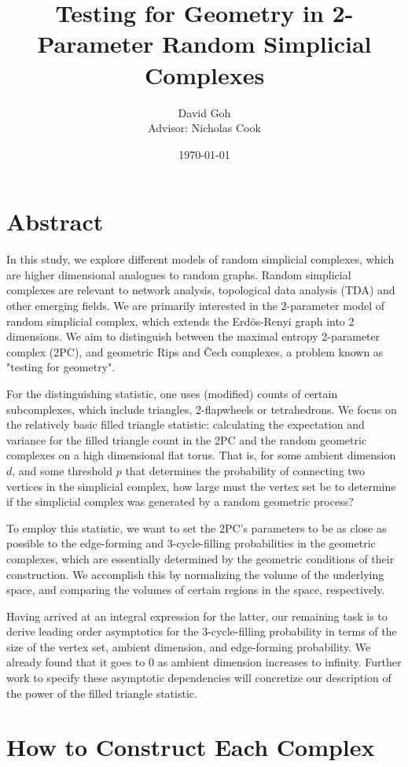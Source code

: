 \documentclass[11pt]{article}
\title{Testing for Geometry in 2-Parameter Random Simplicial Complexes}
\author{David Goh \\ Advisor: Nicholas Cook}
\date{\today}
\theoremstyle{definition}
\begin{document}
\maketitle

\section{Abstract}

In this study, we explore different models of random simplicial complexes, which are higher dimensional analogues to random graphs. Random simplicial complexes are relevant to network analysis, topological data analysis (TDA) and other emerging fields. We are primarily interested in the 2-parameter model of random simplicial complex, which extends the Erd\"{o}s-Renyi graph into 2 dimensions. We aim to distinguish between the maximal entropy 2-parameter complex (2PC), and geometric Rips and Čech complexes, a problem known as "testing for geometry". 

For the distinguishing statistic, one uses (modified) counts of certain subcomplexes, which include triangles, 2-flapwheels or tetrahedrons. We focus on the relatively basic filled triangle statistic: calculating the expectation and variance for the filled triangle count in the 2PC and the random geometric complexes on a high dimensional flat torus. That is, for some ambient dimension $d$, and some threshold $p$ that determines the probability of connecting two vertices in the simplicial complex, how large must the vertex set be to determine if the simplicial complex was generated by a random geometric process? 

To employ this statistic, we want to set the 2PC's parameters to be as close as possible to the edge-forming and 3-cycle-filling probabilities in the geometric complexes, which are essentially determined by the geometric conditions of their construction. We accomplish this by normalizing the volume of the underlying space, and comparing the volumes of certain regions in the space, respectively. 

Having arrived at an integral expression for the latter, our remaining task is to derive leading order asymptotics for the 3-cycle-filling probability in terms of the size of the vertex set, ambient dimension, and edge-forming probability. We already found that it goes to 0 as ambient dimension increases to infinity. Further work to specify these asymptotic dependencies will concretize our description of the power of the filled triangle statistic.
\newpage
\section{How to Construct Each Complex}
\end{document}

